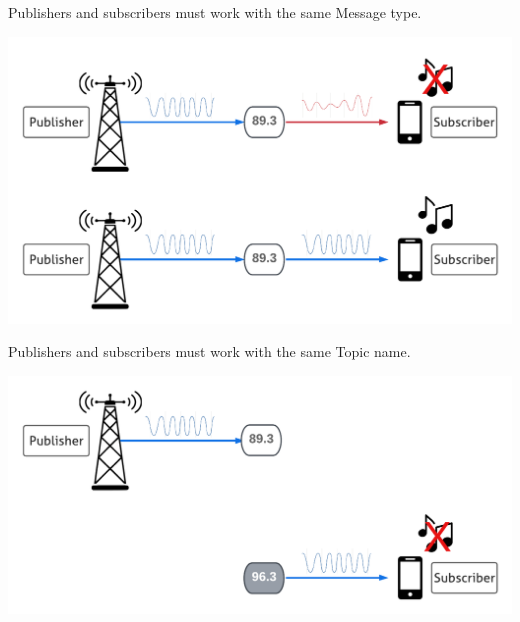 \documentclass[usenames,11,dvipsnames,svgnames,x11names,aspectratio=1610,bibref]{beamer}
\newcommand{\mydisclaimer}{{\color{disclaimer}{\footnotesize Lecture 1~}}}
\renewcommand\sec{{\cnordSix{\secname}\hfill\mydisclaimer} }
\begin{document}
\begin{frame}[fragile]{\sec}
\vspace*{\fill}
\begin{center} 
Publishers and subscribers must work with the same Message type.

\includegraphics[width=.7\linewidth]{figures/lecture2/analogy2.pdf}

\end{center}
\vspace*{\fill}
\end{frame}


\begin{frame}[fragile]{\sec}
\vspace*{\fill}
\begin{center} 
Publishers and subscribers must work with the same Topic name.

\includegraphics[width=.7\linewidth]{figures/lecture2/analogy3.pdf}

\end{center}
\vspace*{\fill}
\end{frame}
\end{document}
